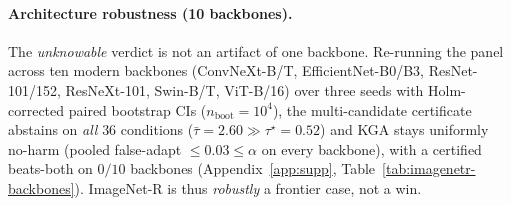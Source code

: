 \documentclass[conference]{IEEEtran}
\theoremstyle{plain}
\theoremstyle{definition}
\begin{document}
\begin{table}[tb]\centering\small
{}
\caption{\textbf{ImageNet-R: a real natural shift in the \emph{unknowable} regime.}
Mixed harm ($13.9\%$), weak detectability (AUC $0.662$), low margins
($\bar B{=}{+}0.017$): the certificate abstains everywhere, as
Corollary~\ref{cor:forced-abstain} mandates, and the CEI diagnostic correctly refuses
the agreement route for co-trained candidates ($\tau\gg\tau^\star$ on all $48$
conditions). Single-seed light protocol; the three candidates share one backbone, which
is exactly the CEI-violating setting the diagnostic exists to catch.}
\label{tab:imagenetr}
\end{table}

\paragraph{Architecture robustness (10 backbones).} The \emph{unknowable} verdict is not an
artifact of one backbone. Re-running the panel across ten modern backbones (ConvNeXt-B/T,
EfficientNet-B0/B3, ResNet-101/152, ResNeXt-101, Swin-B/T, ViT-B/16) over three seeds with
Holm-corrected paired bootstrap CIs ($n_{\mathrm{boot}}{=}10^4$), the multi-candidate certificate
abstains on \emph{all} $36$ conditions ($\bar\tau{=}2.60\gg\tau^\star{=}0.52$) and \textsc{KGA}
stays uniformly no-harm (pooled false-adapt $\le0.03\le\alpha$ on every backbone), with a certified
beats-both on $0/10$ backbones (Appendix~\ref{app:supp}, Table~\ref{tab:imagenetr-backbones}).
ImageNet-R is thus \emph{robustly} a frontier case, not a win.
\end{document}
